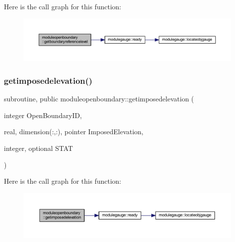 Here is the call graph for this function\+:\nopagebreak
\begin{figure}[H]
\begin{center}
\leavevmode
\includegraphics[width=350pt]{namespacemoduleopenboundary_a26e04e1ec6a8b2b4481ebb096e1c36b1_cgraph}
\end{center}
\end{figure}
\mbox{\label{namespacemoduleopenboundary_a620ec04ba9bf0bef4684a93c01e856e3}} 
\subsubsection{\texorpdfstring{getimposedelevation()}{getimposedelevation()}}
{\footnotesize\ttfamily subroutine, public moduleopenboundary\+::getimposedelevation (\begin{DoxyParamCaption}\item[{integer}]{Open\+Boundary\+ID,  }\item[{real, dimension(\+:,\+:), pointer}]{Imposed\+Elevation,  }\item[{integer, optional}]{S\+T\+AT }\end{DoxyParamCaption})}

Here is the call graph for this function\+:\nopagebreak
\begin{figure}[H]
\begin{center}
\leavevmode
\includegraphics[width=350pt]{namespacemoduleopenboundary_a620ec04ba9bf0bef4684a93c01e856e3_cgraph}
\end{center}
\end{figure}
\mbox{\label{namespacemoduleopenboundary_a4770186a431ef5de9034a0b7eb410c43}} 
